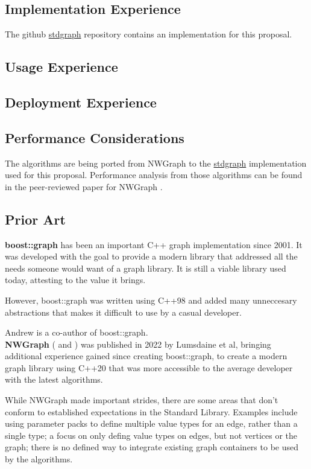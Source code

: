 \subsection{Implementation Experience}
The github \href{https://github.com/stdgraph}{stdgraph} repository contains an implementation for this proposal.

\subsection{Usage Experience}
\subsection{Deployment Experience}
\subsection{Performance Considerations}
The algorithms are being ported from NWGraph to the \href{https://github.com/stdgraph}{stdgraph} implementation used for this proposal. Performance analysis from those algorithms can be found in the peer-reviewed paper for NWGraph \cite{REF_nwgraph_paper}.

\subsection{Prior Art}
\textbf{boost::graph} has been an important C++ graph implementation since 2001. It was developed with the goal to provide
a modern library that addressed all the needs someone would want of a graph library. It is still a viable library used today,
attesting to the value it brings.

However, boost::graph was written using C++98 and added many unneccesary abstractions that makes it difficult
to use by a casual developer. 

Andrew is a co-author of boost::graph.
\\

\textbf{NWGraph} (\cite{REF_nwgraph_library} and \cite{REF_nwgraph_paper}) was published in 2022
by Lumsdaine et al, bringing additional experience gained since creating boost::graph, to create a modern graph library using C++20 that
was more accessible to the average developer with the latest algorithms.

While NWGraph made
important strides, there are some areas that don't conform to established expectations in the Standard Library. Examples
include using parameter packs to define multiple value types for an edge, rather than a single type; a focus on only defing value types on edges, but not vertices or the graph; there is no defined way to
integrate existing graph containers to be used by the algorithms.
\\

